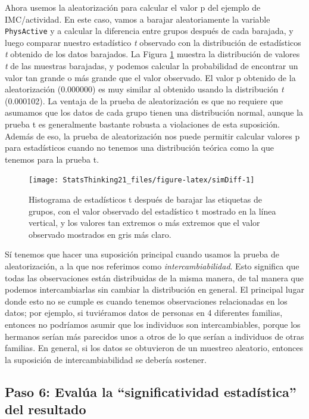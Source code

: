 \documentclass[
  12pt,
]{book}
\theoremstyle{definition}
\theoremstyle{definition}
\theoremstyle{definition}
\theoremstyle{remark}
\begin{document}
Ahora usemos la aleatorización para calcular el valor p del ejemplo de IMC/actividad. En este caso, vamos a barajar aleatoriamente la variable \texttt{PhysActive} y a calcular la diferencia entre grupos después de cada barajada, y luego comparar nuestro estadístico \emph{t} observado con la distribución de estadísticos \emph{t} obtenido de los datos barajados. La Figura \ref{fig:simDiff} muestra la distribución de valores \emph{t} de las muestras barajadas, y podemos calcular la probabilidad de encontrar un valor tan grande o más grande que el valor observado. El valor p obtenido de la aleatorización (0.000000) es muy similar al obtenido usando la distribución \emph{t} (0.000102). La ventaja de la prueba de aleatorización es que no requiere que asumamos que los datos de cada grupo tienen una distribución normal, aunque la prueba t es generalmente bastante robusta a violaciones de esta suposición. Además de eso, la prueba de aleatorización nos puede permitir calcular valores p para estadísticos cuando no tenemos una distribución teórica como la que tenemos para la prueba t.

\begin{figure}
\texttt{[image: StatsThinking21\_files/figure-latex/simDiff-1]} \caption{Histograma de estadísticos t después de barajar las etiquetas de grupos, con el valor observado del estadístico t mostrado en la línea vertical, y los valores tan extremos o más extremos que el valor observado mostrados en gris más claro.}\label{fig:simDiff}
\end{figure}

Sí tenemos que hacer una suposición principal cuando usamos la prueba de aleatorización, a la que nos referimos como \emph{intercambiabilidad}. Esto significa que todas las observaciones están distribuidas de la misma manera, de tal manera que podemos intercambiarlas sin cambiar la distribución en general. El principal lugar donde esto no se cumple es cuando tenemos observaciones relacionadas en los datos; por ejemplo, si tuviéramos datos de personas en 4 diferentes familias, entonces no podríamos asumir que los individuos son intercambiables, porque los hermanos serían más parecidos unos a otros de lo que serían a individuos de otras familias. En general, si los datos se obtuvieron de un muestreo aleatorio, entonces la suposición de intercambiabilidad se debería sostener.

\hypertarget{paso-6-evaluxfaa-la-significatividad-estaduxedstica-del-resultado}{%
\subsection{Paso 6: Evalúa la ``significatividad estadística'' del resultado}\label{paso-6-evaluxfaa-la-significatividad-estaduxedstica-del-resultado}}
\end{document}
